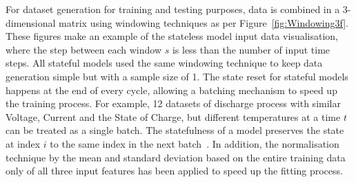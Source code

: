 %
For dataset generation for training and testing purposes, data is combined in a 3-dimensional matrix using windowing techniques as per \mbox{Figure~\ref{fig:Windowing3f}}.
These figures make an example of the stateless model input data visualisation, where the step between each window $s$ is less than the number of input time steps.
All stateful models used the same windowing technique to keep data generation simple but with a sample size of 1.
The state reset for stateful models happens at the end of every cycle, allowing a batching mechanism to speed up the training process.
For example, 12 datasets of discharge process with similar Voltage, Current and the State of Charge, but different temperatures at a time $t$ can be treated as a single batch.
The statefulness of a model preserves the state at index $i$ to the same index in the next batch~\cite{zhu_statefulnes_tfdocs_2020}.
In addition, the normalisation technique by the mean and standard deviation based on the entire training data only of all three input features has been applied to speed up the fitting process.

